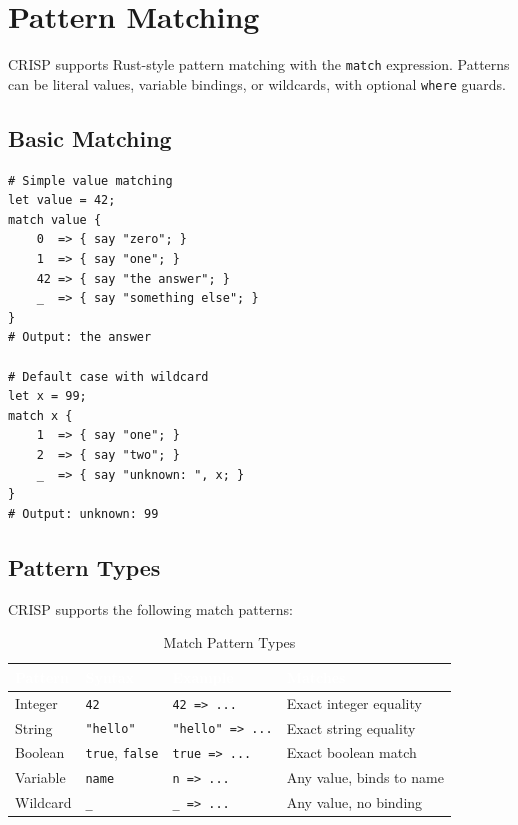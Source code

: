 \section{Pattern Matching}

CRISP supports Rust-style pattern matching with the \texttt{match} expression. Patterns can be literal values, variable bindings, or wildcards, with optional \texttt{where} guards.

\subsection{Basic Matching}

\begin{tcolorbox}[colback=codebg, colframe=darkpurple, colbacktitle=darkpurple, title=\textbf{\textcolor{codegold}{Basic Match}}, fonttitle=\bfseries, sharp corners]
\begin{lstlisting}
# Simple value matching
let value = 42;
match value {
    0  => { say "zero"; }
    1  => { say "one"; }
    42 => { say "the answer"; }
    _  => { say "something else"; }
}
# Output: the answer

# Default case with wildcard
let x = 99;
match x {
    1  => { say "one"; }
    2  => { say "two"; }
    _  => { say "unknown: ", x; }
}
# Output: unknown: 99
\end{lstlisting}
\end{tcolorbox}

\subsection{Pattern Types}

CRISP supports the following match patterns:

\begin{table}[H]
\centering
{}
\caption{\textcolor{darkpurple}{Match Pattern Types}}
\vspace{0.3em}
\begin{tabular}{@{}lllp{5cm}@{}}
\toprule
\rowcolor{softvioletdark}
\textbf{\textcolor{white}{Pattern}} & \textbf{\textcolor{white}{Syntax}} & \textbf{\textcolor{white}{Example}} & \textbf{\textcolor{white}{Matches}} \\
\midrule
Integer & \texttt{42} & \texttt{42 => ...} & Exact integer equality \\
String & \texttt{"hello"} & \texttt{"hello" => ...} & Exact string equality \\
Boolean & \texttt{true}, \texttt{false} & \texttt{true => ...} & Exact boolean match \\
Variable & \texttt{name} & \texttt{n => ...} & Any value, binds to name \\
Wildcard & \texttt{\_} & \texttt{\_ => ...} & Any value, no binding \\
\bottomrule
\end{tabular}
\end{table}

